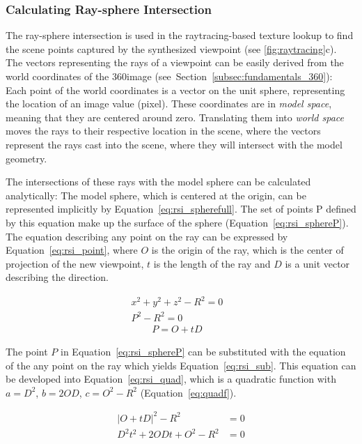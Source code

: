 \subsubsection{Calculating Ray-sphere Intersection}
The ray-sphere intersection is used in the raytracing-based texture lookup to find the scene points captured by the synthesized viewpoint (see \ref{fig:raytracing}c). The vectors representing the rays of a viewpoint can be easily derived from the world coordinates of the 360\degree image (see~Section~\ref{subsec:fundamentals_360}): Each point of the world coordinates is a vector on the unit sphere, representing the location of an image value (pixel). These coordinates are in \emph{model space}, meaning that they are centered around zero. Translating them into \emph{world space} moves the rays to their respective location in the scene, where the vectors represent the rays cast into the scene, where they will intersect with the model geometry.

The intersections of these rays with the model sphere can be calculated analytically: The model sphere, which is centered at the origin, can be represented implicitly by Equation~\ref{eq:rsi_spherefull}. The set of points P defined by this equation make up the surface of the sphere (Equation~\ref{eq:rsi_sphereP}). 
The equation describing any point on the ray can be expressed by Equation~\ref{eq:rsi_point}, where $O$ is the origin of the ray, which is the center of projection of the new viewpoint, $t$ is the length of the ray and $D$ is a unit vector describing the direction. 

\begin{align}
  x^2 + y^2 + z^2 - R^2 = 0&\label{eq:rsi_spherefull}\\ 
  P^2 - R^2 = 0&\label{eq:rsi_sphereP}
\end{align} 
\begin{align}
  P = O + tD& \label{eq:rsi_point}
\end{align} 

The point $P$ in Equation~\ref{eq:rsi_sphereP} can be substituted with the equation of the any point on the ray which yields Equation~\ref{eq:rsi_sub}. This equation can be developed into Equation~\ref{eq:rsi_quad}, which is a quadratic function with $a = D^2$, $b = 2OD$, $c = O^2-R^2$ (Equation~\ref{eq:quadf}).

\begin{align}
  |O + tD|^2 - R^2 &= 0  \label{eq:rsi_sub}\\
  D^2 t^2 + 2ODt + O^2 - R^2 &= 0 \label{eq:rsi_quad}
\end{align}

